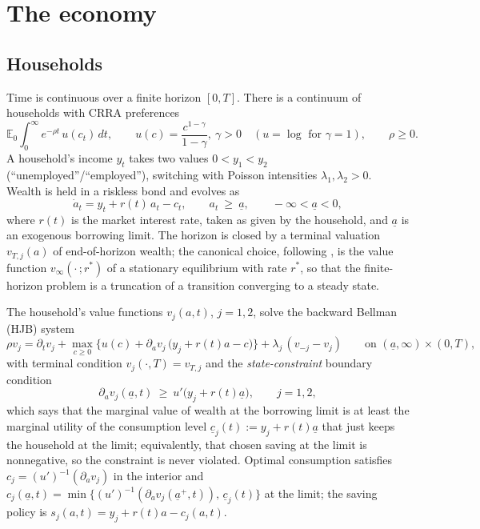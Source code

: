\documentclass[11pt]{article}
\theoremstyle{definition}
\theoremstyle{remark}
\newcommand{\ubar}[1]{\underline{#1}}
\newcommand{\E}{\mathbb{E}}
\newcommand{\dd}{\,d}
\newcommand{\ubc}{\ubar{c}}
\newcommand{\uba}{\ubar{a}}
\begin{document}
\section{The economy}
\label{sec:model}

\subsection{Households}

Time is continuous over a finite horizon $[0,T]$. There is a continuum
of households with CRRA preferences
\[
\E_0\int_0^\infty e^{-\rho t}\,u(c_t)\dd t,\qquad
u(c)=\frac{c^{1-\gamma}}{1-\gamma},\ \gamma>0
\quad(u=\log\text{ for }\gamma=1),\qquad \rho\ge0 .
\]
A household's income $y_t$ takes two values $0<y_1<y_2$
(``unemployed''/``employed''), switching with Poisson intensities
$\lambda_1,\lambda_2>0$. Wealth is held in a riskless bond and evolves
as
\[
\dot a_t=y_t+r(t)\,a_t-c_t,\qquad a_t\ \ge\ \uba,
\qquad -\infty<\uba<0,
\]
where $r(t)$ is the market interest rate, taken as given by the
household, and $\uba$ is an exogenous borrowing limit. The horizon is
closed by a terminal valuation $v_{T,j}(a)$ of end-of-horizon wealth;
the canonical choice, following \citet{AHLLM2022}, is the value
function $v_{\infty}(\cdot\,;r^*)$ of a stationary equilibrium with
rate $r^*$, so that the finite-horizon problem is a truncation of a
transition converging to a steady state.

The household's value functions $v_j(a,t)$, $j=1,2$, solve the
backward Bellman (HJB) system
\begin{equation}\label{eq:HJB}
\rho v_j=\partial_t v_j+\max_{c\ge0}\Big\{u(c)+\partial_a
v_j\,\big(y_j+r(t)a-c\big)\Big\}+\lambda_j\,(v_{-j}-v_j)
\qquad\text{on }(\uba,\infty)\times(0,T),
\end{equation}
with terminal condition $v_j(\cdot,T)=v_{T,j}$ and the
\emph{state-constraint} boundary condition
\begin{equation}\label{eq:BC}
\partial_a v_j(\uba,t)\ \ge\ u'\big(y_j+r(t)\uba\big),
\qquad j=1,2,
\end{equation}
which says that the marginal value of wealth at the borrowing limit is
at least the marginal utility of the consumption level
$\ubc_j(t):=y_j+r(t)\uba$ that just keeps the household at the limit;
equivalently, that chosen saving at the limit is nonnegative, so the
constraint is never violated. Optimal consumption satisfies
$c_j=(u')^{-1}(\partial_a v_j)$ in the interior and
$c_j(\uba,t)=\min\{(u')^{-1}(\partial_a v_j(\uba^+,t)),\,\ubc_j(t)\}$
at the limit; the saving policy is $s_j(a,t)=y_j+r(t)a-c_j(a,t)$.
\end{document}
